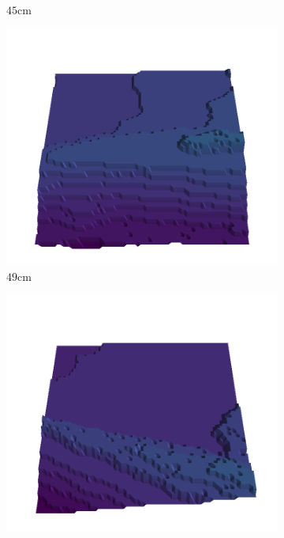 \documentclass[../document.tex]{subfiles}
\begin{document}
\begin{figure}[H]
\begin{subfigure}[b]{0.19\textwidth}
    \caption{$45$cm}
    \end{subfigure}
    \begin{subfigure}[b]{0.19\textwidth}
    \includegraphics[width=\linewidth]{../img/5/quarry/all/best/49-patch-3d-majavi-colormap-4.png}
    \caption{$49$cm}
    \end{subfigure}
    \begin{subfigure}[b]{0.19\textwidth}
    \includegraphics[width=\linewidth]{../img/5/quarry/all/best/51-patch-3d-majavi-colormap-5.png}

\end{subfigure}
\end{figure}
\end{document}
